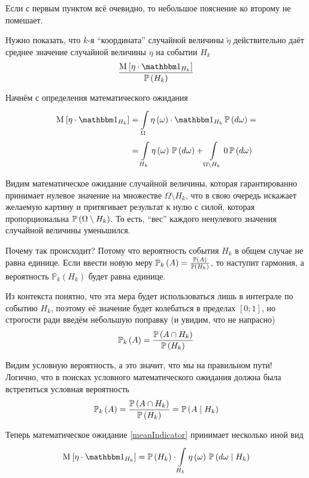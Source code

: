 Если с первым пунктом всё очевидно,
то небольшое пояснение ко второму не помешает.

Нужно показать, что $k$-я ``координата'' случайной величины $\tilde{\eta}$
действительно даёт среднее значение случайной величины $\eta$ на событии $H_k$
$$\frac{\Mean{ \eta \cdot \indicatorof{H_k} }}{\probability{H_k}}$$

Начнём с определения математического ожидания
\begin{equation}\label{meanIndicator}
    \begin{aligned}
    \Mean{ \eta \cdot \indicatorof{H_k} }
        &=\integrall{\Omega}{\probability{d\omega}}{
            \eta\left( \omega \right) \cdot \indicatorof{H_k}} =\\
        &=\integrall{H_k}{\probability{d\omega}}{\eta\left( \omega \right)}
            + \integrall{\Omega \setminus H_k}{
                \probability{d\omega}}{0}
    \end{aligned}
\end{equation}

Видим математическое ожидание случайной величины,
которая гарантированно принимает нулевое значение
на множестве $\Omega \setminus H_k$,
что в свою очередь искажает желаемую картину и притягивает результат к нулю
с силой, которая пропорциональна $\mathbb{P}\left( \Omega \setminus H_k \right)$.
То есть, ``вес'' каждого ненулевого значения случайной величины уменьшился.

Почему так происходит?
Потому что вероятность события $H_k$ в общем случае не равна единице.
Если ввести новую меру
$\mathbb{P}_k\left( A \right)=\frac{\mathbb{P}\left( A \right)}{\mathbb{P}\left( H_k \right)}$,
то наступит гармония, а
вероятность $\mathbb{P}_k\left( H_k \right)$ будет равна единице.

Из контекста понятно, что эта мера будет использоваться лишь в интеграле
по событию $H_k$,
поэтому её значение будет колебаться в пределах $\left[ 0;1 \right]$,
но строгости ради введём небольшую поправку (и увидим, что не напрасно)
$$\mathbb{P}_k\left( A \right)
    =\frac{\mathbb{P}\left( A\cap H_k \right)}{\mathbb{P}\left( H_k \right)}$$

Видим условную вероятность, а это значит, что мы на правильном пути!
Логично, что в поисках условного математического ожидания
должна была встретиться условная вероятность
$$\mathbb{P}_k\left( A \right)
    =\frac{\mathbb{P}\left( A\cap H_k \right)}{\mathbb{P}\left( H_k \right)}
    =\mathbb{P}\left( A \;\middle|\; H_k \right)$$

Теперь математическое ожидание \eqref{meanIndicator}
принимает несколько иной вид
$$\Mean{ \eta \cdot \indicatorof{H_k} }
        = \probability{H_k}
            \cdot \integrall{H_k}{\probability{d\omega \mcond H_k}}{
                \eta\left( \omega \right)}$$

